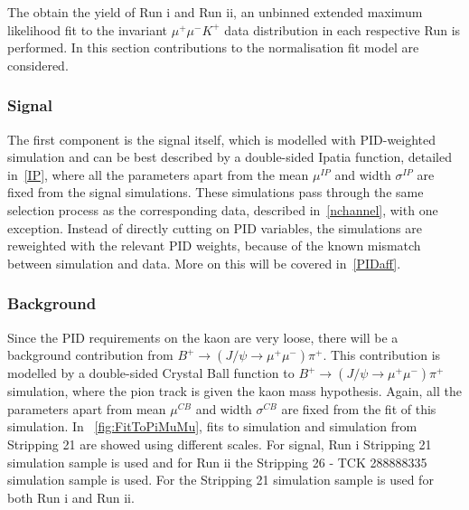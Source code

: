 The obtain the \bjpsimumuk yield of Run \Rn{1} and Run \Rn{2}, an unbinned extended maximum likelihood fit to the invariant $\mu^{+} \mu^{-} K^{+}$ data distribution in each respective Run is performed. In this section contributions to the normalisation fit model are considered. 

\subsubsection{Signal}

	The first component is the signal itself, which is modelled with PID-weighted simulation and can be best described by a double-sided Ipatia function, detailed in~\autoref{IP}, where all the parameters apart from the mean $\mu^{IP}$ and width $\sigma^{IP}$ are fixed from the signal simulations. These simulations pass through the same selection process as the corresponding \bjpsimumuk data, described in~\autoref{nchannel}, with one exception. Instead of directly cutting on \gls{PID} variables, the simulations are reweighted with the relevant \gls{PID} weights, because of the known mismatch between simulation and data. More on this will be covered in~\autoref{PIDaff}. 


\subsubsection{\mb{\bjpsimumupi} Background}

Since the PID requirements on the kaon are very loose, there will be a background contribution from $ B^{+} \rightarrow (J/\psi \rightarrow \mu^{+} \mu^{-}) \pi^{+}$. This contribution is modelled by a double-sided Crystal Ball function to $B^{+} \rightarrow (J/\psi \rightarrow \mu^{+} \mu^{-}) \pi^{+}$ simulation, where the pion track is given the kaon mass hypothesis. Again, all the parameters apart from mean $\mu^{CB}$ and width $\sigma^{CB}$ are fixed from the fit of this simulation. In ~\autoref{fig:FitToPiMuMu}, fits to \bjpsimumuk simulation and \bjpsimumupi simulation from Stripping 21 are showed using different scales.
For signal, Run \Rn{1} Stripping 21 simulation sample is used and for Run \Rn{2} the Stripping 26 - TCK 288888335 simulation sample is used. For the \bjpsimumupi Stripping 21 simulation sample is used for both Run \Rn{1} and Run \Rn{2}.


